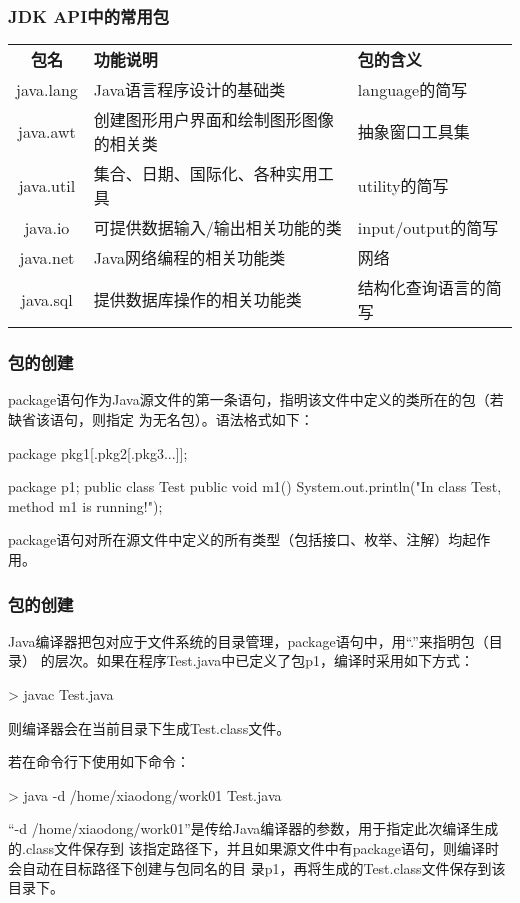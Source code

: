 \begin{frame}
\frametitle{JDK API中的常用包}

\begin{table}
\footnotesize
\setlength{\extrarowheight}{1.2mm}
\begin{tabular}{c|p{5cm}|p{3cm}}
{\bf 包名} & {\bf 功能说明} & {\bf 包的含义}   \\
java.lang & Java语言程序设计的基础类 & language的简写\\
java.awt & 创建图形用户界面和绘制图形图像的相关类 & 抽象窗口工具集\\
java.util & 集合、日期、国际化、各种实用工具 & utility的简写\\
java.io & 可提供数据输入/输出相关功能的类 & input/output的简写\\
java.net & Java网络编程的相关功能类 & 网络\\
java.sql & 提供数据库操作的相关功能类 & 结构化查询语言的简写\\
\end{tabular}
\end{table}
\end{frame}

\begin{frame}[fragile] %
\frametitle{包的创建}

package语句作为Java源文件的第一条语句，指明该文件中定义的类所在的包（若缺省该语句，则指定
为无名包）。语法格式如下：
\begin{javaCode}
package pkg1[.pkg2[.pkg3...]];
\end{javaCode}
\begin{javaCode}
package p1;
public class Test{
  public void m1(){
    System.out.println("In class Test, 
    method m1 is running!");
  }
}
\end{javaCode}
package语句对所在源文件中定义的所有类型（包括接口、枚举、注解）均起作用。
\end{frame}

\begin{frame}[fragile] %
\frametitle{包的创建}
Java编译器把包对应于文件系统的目录管理，package语句中，用“.”来指明包（目录）
的层次。如果在程序Test.java中已定义了包p1，编译时采用如下方式：
\begin{shCode}
  > javac Test.java
\end{shCode}
则编译器会在当前目录下生成Test.class文件。

若在命令行下使用如下命令：
\begin{shCode}
  > java -d /home/xiaodong/work01 Test.java
\end{shCode}
“-d /home/xiaodong/work01”是传给Java编译器的参数，用于指定此次编译生成的.class文件保存到
该指定路径下，并且如果源文件中有package语句，则编译时会自动在目标路径下创建与包同名的目
录p1，再将生成的Test.class文件保存到该目录下。
\end{frame}

